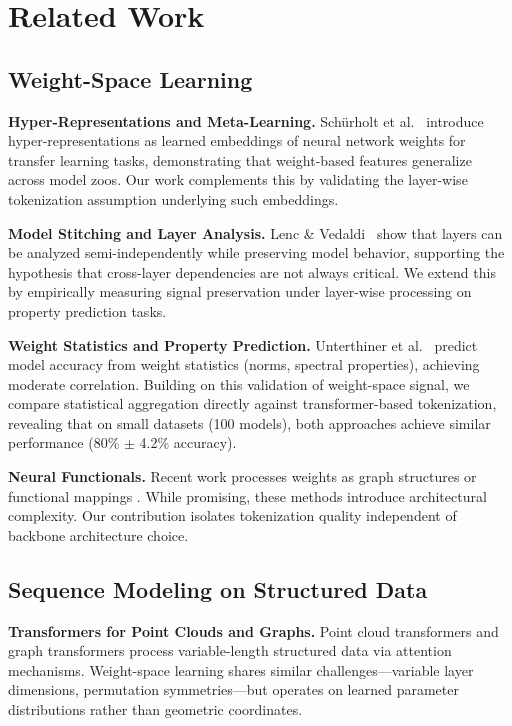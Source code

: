 \section{Related Work}

\subsection{Weight-Space Learning}

\textbf{Hyper-Representations and Meta-Learning.} Sch\"urholt et al.~\cite{schurholt2022hyper} introduce hyper-representations as learned embeddings of neural network weights for transfer learning tasks, demonstrating that weight-based features generalize across model zoos. Our work complements this by validating the layer-wise tokenization assumption underlying such embeddings.

\textbf{Model Stitching and Layer Analysis.} Lenc \& Vedaldi~\cite{lenc2015understanding} show that layers can be analyzed semi-independently while preserving model behavior, supporting the hypothesis that cross-layer dependencies are not always critical. We extend this by empirically measuring signal preservation under layer-wise processing on property prediction tasks.

\textbf{Weight Statistics and Property Prediction.} Unterthiner et al.~\cite{unterthiner2020predicting} predict model accuracy from weight statistics (norms, spectral properties), achieving moderate correlation. Building on this validation of weight-space signal, we compare statistical aggregation directly against transformer-based tokenization, revealing that on small datasets (100 models), both approaches achieve similar performance (80\% $\pm$ 4.2\% accuracy).

\textbf{Neural Functionals.} Recent work processes weights as graph structures or functional mappings \cite{navon2023equivariant,zhou2022neural}. While promising, these methods introduce architectural complexity. Our contribution isolates tokenization quality independent of backbone architecture choice.

\subsection{Sequence Modeling on Structured Data}

\textbf{Transformers for Point Clouds and Graphs.} Point cloud transformers \cite{zhao2021point} and graph transformers \cite{dwivedi2021generalization} process variable-length structured data via attention mechanisms. Weight-space learning shares similar challenges—variable layer dimensions, permutation symmetries—but operates on learned parameter distributions rather than geometric coordinates.

